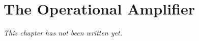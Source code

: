 \chapter{The Operational Amplifier}\label{ch:b1:operational-amplifier}


\emph{This chapter has not been written yet.}

